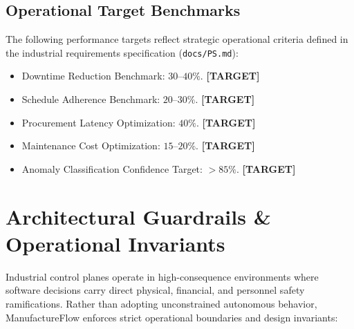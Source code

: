 \documentclass[10pt,twocolumn,a4paper]{article}
\newcommand{\claimtag}[1]{%
    \textsf{\textbf{\scriptsize\color{deepslate}[#1]}}%
}
\begin{document}
\subsection{Operational Target Benchmarks}
The following performance targets reflect strategic operational criteria defined in the industrial requirements specification (\texttt{docs/PS.md}):
\begin{itemize}
    \item Downtime Reduction Benchmark: $30\text{--}40\%$. \claimtag{TARGET}
    \item Schedule Adherence Benchmark: $20\text{--}30\%$. \claimtag{TARGET}
    \item Procurement Latency Optimization: $40\%$. \claimtag{TARGET}
    \item Maintenance Cost Optimization: $15\text{--}20\%$. \claimtag{TARGET}
    \item Anomaly Classification Confidence Target: $>85\%$. \claimtag{TARGET}
\end{itemize}

\section{Architectural Guardrails \& Operational Invariants}
\label{sec:guardrails}
Industrial control planes operate in high-consequence environments where software decisions carry direct physical, financial, and personnel safety ramifications. Rather than adopting unconstrained autonomous behavior, ManufactureFlow enforces strict operational boundaries and design invariants:
\end{document}

